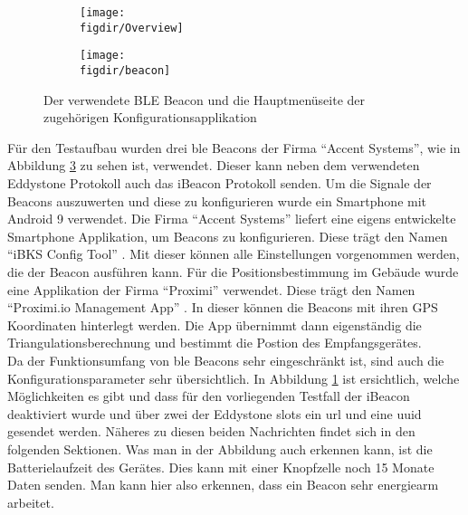 \begin{figure}[hbtp]
	\centering
	\captionsetup[subfigure]{width=0.8\textwidth,justification=raggedright}%
	\begin{subfigure}[t]{0.4\textwidth}
		\texttt{[image: \\figdir/Overview]}
		\label{FIG:overview}
	\end{subfigure}
	\begin{subfigure}[t]{0.35\textwidth}
		\texttt{[image: \\figdir/beacon]}
		\label{FIG:beacon}
	\end{subfigure}
	\caption{Der verwendete BLE Beacon und die Hauptmenüseite der zugehörigen Konfigurationsapplikation}
\end{figure} 

\noindent Für den Testaufbau wurden drei \ac{ble} Beacons der Firma "`Accent Systems"', wie in Abbildung \ref{FIG:beacon} zu sehen ist, verwendet. Dieser kann neben dem verwendeten Eddystone Protokoll auch das iBeacon Protokoll senden. Um die Signale der Beacons auszuwerten und diese zu konfigurieren wurde ein Smartphone mit Android 9 verwendet. Die Firma "`Accent Systems"' liefert eine eigens entwickelte Smartphone Applikation, um Beacons zu konfigurieren. Diese trägt den Namen "`iBKS Config Tool"' \cite{BKS:WWW}. Mit dieser können alle Einstellungen vorgenommen werden, die der Beacon ausführen kann. Für die Positionsbestimmung im Gebäude wurde eine Applikation der Firma "`Proximi"' verwendet. Diese trägt den Namen "`Proximi.io Management App"' \cite{PRX:WWW}. In dieser können die Beacons mit ihren GPS Koordinaten hinterlegt werden. Die App übernimmt dann eigenständig die Triangulationsberechnung und bestimmt die Postion des Empfangsgerätes.\\ 

\noindent Da der Funktionsumfang von \ac{ble} Beacons sehr eingeschränkt ist, sind auch die Konfigurationsparameter sehr übersichtlich. In Abbildung \ref{FIG:overview} ist ersichtlich, welche Möglichkeiten es gibt und dass für den vorliegenden Testfall der iBeacon deaktiviert wurde und über zwei der Eddystone slots ein \ac{url} und eine \ac{uuid} gesendet werden. Näheres zu diesen beiden Nachrichten findet sich in den folgenden Sektionen. Was man in der Abbildung auch erkennen kann, ist die Batterielaufzeit des Gerätes. Dies kann mit einer Knopfzelle noch 15 Monate Daten senden. Man kann hier also erkennen, dass ein Beacon sehr energiearm arbeitet.\\

